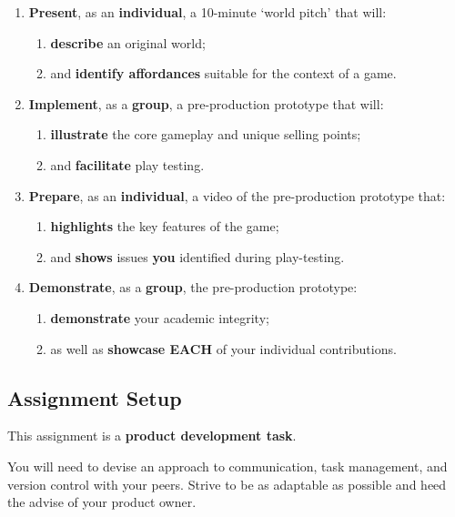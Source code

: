 \documentclass{../../fal_assignment}
\begin{document}
\begin{enumerate}[label=(\Alph*)]
    \item \textbf{Present}, as an \textbf{individual}, a 10-minute `world pitch' that will:
    	\begin{enumerate}[label=\roman*.]
    		\item \textbf{describe} an original world;
    		\item and \textbf{identify affordances} suitable for the context of a game.
	\end{enumerate}
    \item \textbf{Implement}, as a \textbf{group}, a pre-production prototype that will:
    	\begin{enumerate}[label=\roman*.]
    		\item \textbf{illustrate} the core gameplay and unique selling points;
    		\item and \textbf{facilitate} play testing.
	\end{enumerate}
    \item \textbf{Prepare}, as an \textbf{individual}, a video of the pre-production prototype that:
    	\begin{enumerate}[label=\roman*.]
    		\item \textbf{highlights} the key features of the game;
    		\item and \textbf{shows} issues \textbf{you} identified during play-testing.
	\end{enumerate}
    \item \textbf{Demonstrate}, as a \textbf{group}, the pre-production prototype:
    	\begin{enumerate}[label=\roman*.]
    		\item \textbf{demonstrate} your academic integrity;
    		\item as well as \textbf{showcase EACH} of your individual contributions.
	\end{enumerate}
\end{enumerate}

\subsection*{Assignment Setup}

This assignment is a \textbf{product development task}. 

You will need to devise an approach to communication, task management, and version control with your peers. Strive to be as adaptable as possible and heed the advise of your product owner.
\end{document}
